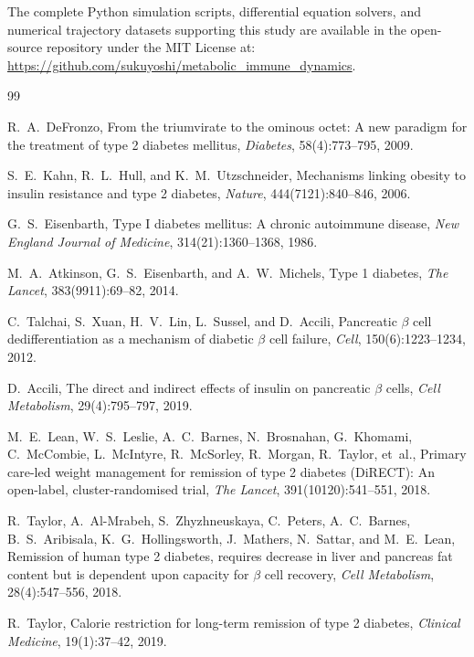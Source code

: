 \documentclass[11pt,a4paper]{article}
\begin{document}
The complete Python simulation scripts, differential equation solvers, and numerical trajectory datasets supporting this study are available in the open-source repository under the MIT License at: \url{https://github.com/sukuyoshi/metabolic_immune_dynamics}.

\begin{thebibliography}{99}

R.~A.~DeFronzo,
\newblock From the triumvirate to the ominous octet: A new paradigm for the treatment of type 2 diabetes mellitus,
\newblock \emph{Diabetes}, 58(4):773--795, 2009.

S.~E.~Kahn, R.~L.~Hull, and K.~M.~Utzschneider,
\newblock Mechanisms linking obesity to insulin resistance and type 2 diabetes,
\newblock \emph{Nature}, 444(7121):840--846, 2006.

G.~S.~Eisenbarth,
\newblock Type I diabetes mellitus: A chronic autoimmune disease,
\newblock \emph{New England Journal of Medicine}, 314(21):1360--1368, 1986.

M.~A.~Atkinson, G.~S.~Eisenbarth, and A.~W.~Michels,
\newblock Type 1 diabetes,
\newblock \emph{The Lancet}, 383(9911):69--82, 2014.

C.~Talchai, S.~Xuan, H.~V.~Lin, L.~Sussel, and D.~Accili,
\newblock Pancreatic $\beta$ cell dedifferentiation as a mechanism of diabetic $\beta$ cell failure,
\newblock \emph{Cell}, 150(6):1223--1234, 2012.

D.~Accili,
\newblock The direct and indirect effects of insulin on pancreatic $\beta$ cells,
\newblock \emph{Cell Metabolism}, 29(4):795--797, 2019.

M.~E.~Lean, W.~S.~Leslie, A.~C.~Barnes, N.~Brosnahan, G.~Khomami, C.~McCombie, L.~McIntyre, R.~McSorley, R.~Morgan, R.~Taylor, et~al.,
\newblock Primary care-led weight management for remission of type 2 diabetes (DiRECT): An open-label, cluster-randomised trial,
\newblock \emph{The Lancet}, 391(10120):541--551, 2018.

R.~Taylor, A.~Al-Mrabeh, S.~Zhyzhneuskaya, C.~Peters, A.~C.~Barnes, B.~S.~Aribisala, K.~G.~Hollingsworth, J.~Mathers, N.~Sattar, and M.~E.~Lean,
\newblock Remission of human type 2 diabetes, requires decrease in liver and pancreas fat content but is dependent upon capacity for $\beta$ cell recovery,
\newblock \emph{Cell Metabolism}, 28(4):547--556, 2018.

R.~Taylor,
\newblock Calorie restriction for long-term remission of type 2 diabetes,
\newblock \emph{Clinical Medicine}, 19(1):37--42, 2019.


\end{thebibliography}
\end{document}

